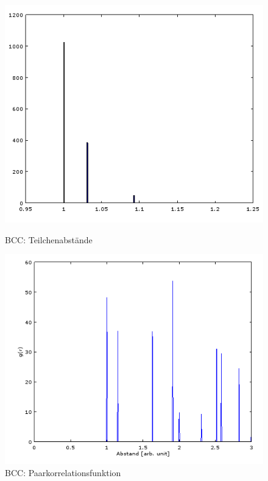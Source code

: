 \begin{figure}[H]
\begin{minipage}[b]{0.5\textwidth}
    \centering
    \includegraphics[scale=0.5]{data/bcc-hist.PNG}
    \caption{BCC: Teilchenabstände}
    \label{fig:bccabstand}
\end{minipage}    
\begin{minipage}[b]{0.5\textwidth}
    \centering
    \includegraphics[scale=0.5]{data/bcc-paircorrelation.PNG}
    \caption{BCC: Paarkorrelationsfunktion}
    \label{fig:bccg}
\end{minipage} 
\end{figure}

